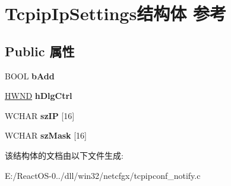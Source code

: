 \hypertarget{struct_tcpip_ip_settings}{}\section{Tcpip\+Ip\+Settings结构体 参考}
\label{struct_tcpip_ip_settings}
\subsection*{Public 属性}
\begin{DoxyCompactItemize}
\item 
\mbox{\label{struct_tcpip_ip_settings_a7362dee6925fa36e464d691483205906}} 
B\+O\+OL {\bfseries b\+Add}
\item 
\mbox{\label{struct_tcpip_ip_settings_af3ee25a1be7aa0506f76f4b62bbed520}} 
\hyperlink{interfacevoid}{H\+W\+ND} {\bfseries h\+Dlg\+Ctrl}
\item 
\mbox{\label{struct_tcpip_ip_settings_ad2b122175336cfb0d94b6e901716a18f}} 
W\+C\+H\+AR {\bfseries sz\+IP} \mbox{[}16\mbox{]}
\item 
\mbox{\label{struct_tcpip_ip_settings_a51c387db0a80a2598f0403ff6c6ef961}} 
W\+C\+H\+AR {\bfseries sz\+Mask} \mbox{[}16\mbox{]}
\end{DoxyCompactItemize}


该结构体的文档由以下文件生成\+:\begin{DoxyCompactItemize}
\item 
E\+:/\+React\+O\+S-\/0../dll/win32/netcfgx/tcpipconf\+\_\+notify.\+c\end{DoxyCompactItemize}
